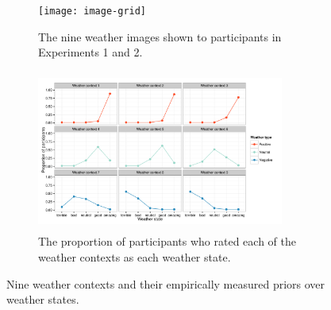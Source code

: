 \documentclass[10pt,letterpaper]{article}
\begin{document}
\begin{figure}
    \begin{subfigure}[b]{0.5\textwidth}
        \texttt{[image: image-grid]}
        \caption{The nine weather images shown to participants in Experiments 1 and 2.}
        \label{images}
    \end{subfigure}
    \hfill
    \begin{subfigure}[b]{0.5\textwidth}
        \includegraphics[width=230pt, height=150pt]{priors}
        \caption{The proportion of participants who rated each of the weather contexts as each weather state. 
     }
        \label{priors}
    \end{subfigure}
    \caption{Nine weather contexts and their empirically measured priors over weather states.}
    \label{fig:three graphs}
\end{figure}
\end{document}
